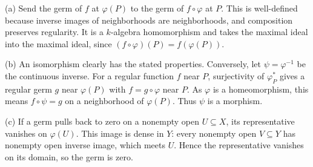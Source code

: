 (a) Send the germ of $f$ at $\varphi(P)$ to the germ of $f\circ\varphi$ at $P$. This is well-defined because inverse images of neighborhoods are neighborhoods, and composition preserves regularity. It is a $k$-algebra homomorphism and takes the maximal ideal into the maximal ideal, since $(f\circ\varphi)(P)=f(\varphi(P))$.

(b) An isomorphism clearly has the stated properties. Conversely, let $\psi=\varphi^{-1}$ be the continuous inverse. For a regular function $f$ near $P$, surjectivity of $\varphi_P^*$ gives a regular germ $g$ near $\varphi(P)$ with $f=g\circ\varphi$ near $P$. As $\varphi$ is a homeomorphism, this means $f\circ\psi=g$ on a neighborhood of $\varphi(P)$. Thus $\psi$ is a morphism.

(c) If a germ pulls back to zero on a nonempty open $U\subseteq X$, its representative vanishes on $\varphi(U)$. This image is dense in $Y$: every nonempty open $V\subseteq Y$ has nonempty open inverse image, which meets $U$. Hence the representative vanishes on its domain, so the germ is zero.
